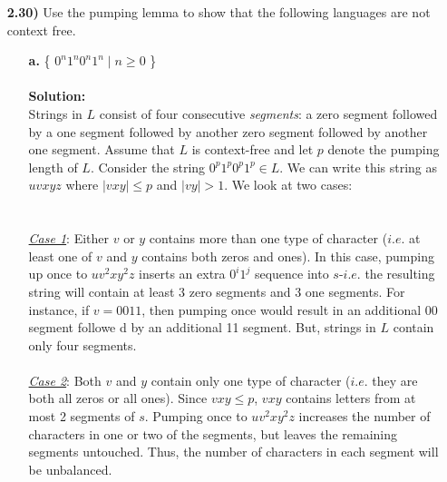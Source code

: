 \documentclass[12pt]{letter}
\begin{document}
\begin{enumerate}
\item[\textbf{2.30)}] Use the pumping lemma to show that the following languages are not context free.\\
\begin{enumerate}
	\item[\textbf{a.}] \{ $0^n1^n0^n1^n \mid n \geq 0$ \} \\
	\leavevmode \\
	\textbf{Solution:} \\
	Strings in $L$ consist of four consecutive \textit{segments}: a zero segment followed by a one segment followed by another zero segment followed by another one segment. Assume that $L$ is context-free and let $p$ denote the pumping length of $L$. Consider the string $0^p1^p0^p1^p \in L$. We can write this string as $uvxyz$ where $|vxy| \leq p$ and $|vy| > 1$. We look at two cases: \\
	\leavevmode \\
	\leavevmode \\
	\underline{\textit{Case 1}}: Either $v$ or $y$ contains more than one type of character ($i.e$. at least one of $v$ and $y$ contains both zeros and ones). In this case, pumping up once to $uv^2xy^2z$ inserts an extra $0^i1^j$ sequence into $s$-$i.e$. the resulting string will contain at least 3 zero segments and 3 one segments. For instance, if $v = 0011$, then pumping once would result in an additional 00 segment followe d by an additional 11 segment. But, strings in $L$ contain only four segments. \\
	\leavevmode \\
	\underline{\textit{Case 2}}: Both $v$ and $y$ contain only one type of character ($i.e$. they are both all zeros or all ones). Since $vxy \leq p$, $vxy$ contains letters from at most 2 segments of $s$. Pumping once to $uv^2xy^2z$ increases the number of characters in one or two of the segments, but leaves the remaining segments untouched. Thus, the number of characters in each segment will be unbalanced.


\end{enumerate}
\end{enumerate}
\end{document}
